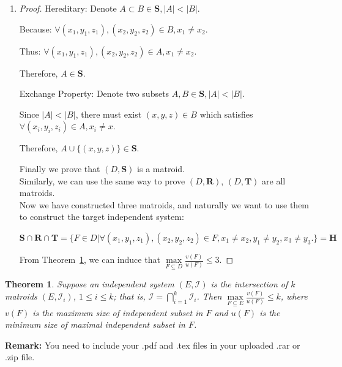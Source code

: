 \documentclass[12pt,a4paper]{article}
\makeatletter
\newtheorem{theorem}{Theorem}
\newtheorem*{solution}{Solution}
\theoremstyle{definition}
\renewenvironment{solution}[1][Solution] {\par\pushQED{\qed}\normalfont\topsep6\p@\@plus6\p@\relax\trivlist\item[\hskip\labelsep\bfseries#1\@addpunct{.}]\ignorespaces}{\popQED\endtrivlist\@endpefalse} \makeatother
\makeatother
\begin{document}
\begin{enumerate}
\begin{enumerate}
\begin{solution}
\begin{proof}
	{\color{blue}Hereditary}: Denote $A\subset B \in \mathbf{S}, |A|<|B|$. 
	
	Because: $\forall (x_1,y_1,z_1), (x_2,y_2,z_2) \in B, x_1\neq x_2 $.
	
	Thus: $\forall (x_1,y_1,z_1), (x_2,y_2,z_2) \in A, x_1\neq x_2 $.
	
	Therefore, $A\in \mathbf{S}$.
	
		{\color{blue}Exchange Property}: Denote two subsets $A, B \in \mathbf{S}, |A| < |B|$.
		
		Since $|A|<|B|$, there must exist $(x, y, z)\in B$ which satisfies $\forall (x_i,y_i,z_i) \in A, x_i \neq x$.
		
		Therefore, $A\cup \{(x,y,z)\} \in \mathbf{S}$.
		
	Finally we prove that $(D, \mathbf{S})$ is a matroid.
~\\
	
Similarly, we can use the same way to prove $(D, \mathbf{R})$, $(D, \mathbf{T})$ are all matroids.
~\\

Now we have constructed three matroids, and naturally we want to use them to construct the target independent system:

$\mathbf{S}\cap \mathbf{R} \cap \mathbf{T} = \{F\in D| \forall (x_1,y_1,z_1), (x_2,y_2,z_2) \in F, x_1\neq x_2, y_1\neq y_2, x_3\neq y_3.\} = \mathbf{H}$

From Theorem~\ref{Thm-Intersect}, we can induce that $\max\limits_{F \subseteq D} \frac{v(F)}{u(F)} \leq 3$.
	\end{proof}
			    
    	    \end{solution}
    \end{enumerate}
    \begin{theorem} \label{Thm-Intersect}
        Suppose an independent system $(E, \mathcal{I})$ is the intersection of $k$ matroids $\left(E, \mathcal{I}_{i}\right)$, $1 \leq i \leq k$; that is, $\mathcal{I}=\bigcap_{i=1}^{k} \mathcal{I}_{i}$. Then $\max\limits_{F \subseteq E} \frac{v(F)}{u(F)} \leq k$, where $v(F)$ is the maximum size of independent subset in $F$ and $u(F)$ is the minimum size of maximal independent subset in $F$.
    \end{theorem}    
\end{enumerate}

\vspace{20pt}

\textbf{Remark:} You need to include your .pdf and .tex files in your uploaded .rar or .zip file.

\end{document}
